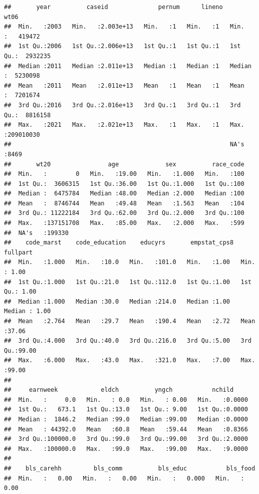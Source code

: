 \documentclass[
]{article}
\begin{document}
\begin{verbatim}
##       year          caseid              pernum      lineno       wt06          
##  Min.   :2003   Min.   :2.003e+13   Min.   :1   Min.   :1   Min.   :   419472  
##  1st Qu.:2006   1st Qu.:2.006e+13   1st Qu.:1   1st Qu.:1   1st Qu.:  2932235  
##  Median :2011   Median :2.011e+13   Median :1   Median :1   Median :  5230098  
##  Mean   :2011   Mean   :2.011e+13   Mean   :1   Mean   :1   Mean   :  7201674  
##  3rd Qu.:2016   3rd Qu.:2.016e+13   3rd Qu.:1   3rd Qu.:1   3rd Qu.:  8816158  
##  Max.   :2021   Max.   :2.021e+13   Max.   :1   Max.   :1   Max.   :209010030  
##                                                             NA's   :8469       
##       wt20                age             sex          race_code  
##  Min.   :        0   Min.   :19.00   Min.   :1.000   Min.   :100  
##  1st Qu.:  3606315   1st Qu.:36.00   1st Qu.:1.000   1st Qu.:100  
##  Median :  6475784   Median :48.00   Median :2.000   Median :100  
##  Mean   :  8746744   Mean   :49.48   Mean   :1.563   Mean   :104  
##  3rd Qu.: 11222184   3rd Qu.:62.00   3rd Qu.:2.000   3rd Qu.:100  
##  Max.   :137151708   Max.   :85.00   Max.   :2.000   Max.   :599  
##  NA's   :199330                                                   
##    code_marst    code_education    educyrs       empstat_cps8     fullpart    
##  Min.   :1.000   Min.   :10.0   Min.   :101.0   Min.   :1.00   Min.   : 1.00  
##  1st Qu.:1.000   1st Qu.:21.0   1st Qu.:112.0   1st Qu.:1.00   1st Qu.: 1.00  
##  Median :1.000   Median :30.0   Median :214.0   Median :1.00   Median : 1.00  
##  Mean   :2.764   Mean   :29.7   Mean   :190.4   Mean   :2.72   Mean   :37.06  
##  3rd Qu.:4.000   3rd Qu.:40.0   3rd Qu.:216.0   3rd Qu.:5.00   3rd Qu.:99.00  
##  Max.   :6.000   Max.   :43.0   Max.   :321.0   Max.   :7.00   Max.   :99.00  
##                                                                               
##     earnweek            eldch          yngch           nchild      
##  Min.   :     0.0   Min.   : 0.0   Min.   : 0.00   Min.   :0.0000  
##  1st Qu.:   673.1   1st Qu.:13.0   1st Qu.: 9.00   1st Qu.:0.0000  
##  Median :  1846.2   Median :99.0   Median :99.00   Median :0.0000  
##  Mean   : 44392.0   Mean   :60.8   Mean   :59.44   Mean   :0.8366  
##  3rd Qu.:100000.0   3rd Qu.:99.0   3rd Qu.:99.00   3rd Qu.:2.0000  
##  Max.   :100000.0   Max.   :99.0   Max.   :99.00   Max.   :9.0000  
##                                                                    
##    bls_carehh         bls_comm          bls_educ           bls_food      
##  Min.   :   0.00   Min.   :   0.00   Min.   :   0.000   Min.   :   0.00  

\end{verbatim}
\end{document}

